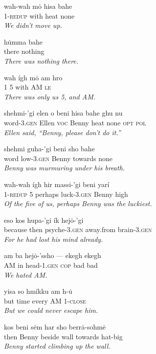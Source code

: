 \documentclass{article}[10pt]
\begin{document}
\begin{exe}
\ex
\gll wah-wah m\.{o} hisa bahe\\
1-\textsc{redup} with heat none\\
\trans \emph{We didn't move up.}

\ex
\gll h\.{u}mma bahe\\
there nothing\\
\trans \emph{There was nothing there.}

\ex
\gll wah \'{i}gh m\.{o} am hro\\
1 5 with AM \textsc{le}\\
\trans \emph{There was only us 5, and AM.}

\ex 
\gll shehmi-'gi elen o beni hisa bahe ghu nu\\
word-3.\textsc{gen} Ellen \textsc{voc} Benny heat none \textsc{opt} \textsc{pol}\\
\trans \emph{Ellen said, ``Benny, please don't do it.''}

\ex
\gll shehmi guha-'gi beni sho bahe\\
word low-3.\textsc{gen} Benny towards none\\
\trans \emph{Benny was murmuring under his breath.}

\ex
\gll wah-wah \'{i}gh hir massi-'gi beni yar\'{i}\\
1-\textsc{redup} 5 perhaps luck-3.\textsc{gen} Benny high\\
\trans \emph{Of the five of us, perhaps Benny was the luckiest.}

\ex
\gll eso kos hupa-'gi \'{i}k hej\.{o}-'gi\\
because then psyche-3.\textsc{gen} away.from brain-3.\textsc{gen}\\
\trans \emph{For he had lost his mind already.}

\ex
\gll am ba hej\.{o}-'ssho --- ekegh ekegh\\
AM in head-1.\textsc{gen} \textsc{cop} bad bad\\
\trans \emph{We hated AM.}

\ex
\gll yisa so hm\'{i}kku am h-\.{u}\\
but time every AM 1-\textsc{close}\\
\trans \emph{But we could never escape him.}

\ex
\gll kos beni s\.{e}m har sho berr\.{a}-sohm\.{e}\\
then Benny beside wall towards hat-big\\
\trans \emph{Benny started climbing up the wall.}


\end{exe}
\end{document}
